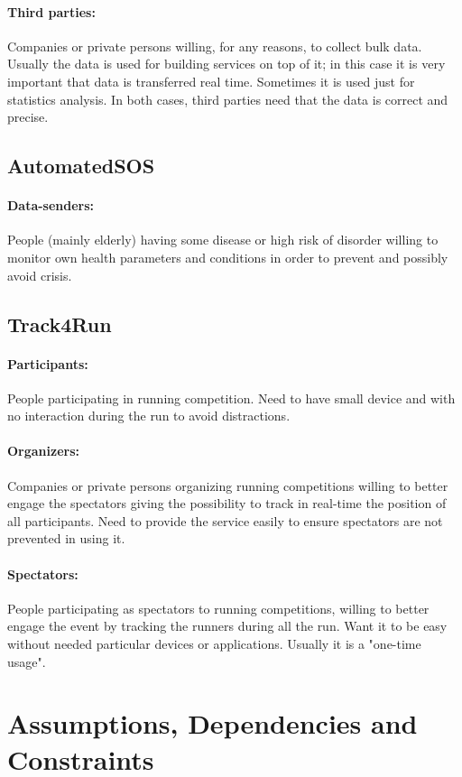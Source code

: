 \documentclass{report}
\begin{document}
				\paragraph{Third parties:}
				Companies or private persons willing, for any reasons, to collect bulk data. Usually the data is used for building services on top of it; in this case it is very important that data is transferred real time. Sometimes it is used just for statistics analysis. In both cases, third parties need that the data is correct and precise. 
			\subsection{AutomatedSOS}
				\paragraph{Data-senders:}
				People (mainly elderly) having some disease or high risk of disorder willing to monitor own health parameters and conditions in order to prevent and possibly avoid crisis.
			\subsection{Track4Run}
				\paragraph{Participants:}
				People participating in running competition. Need to have small device and with no interaction during the run to avoid distractions.
				\paragraph{Organizers:}
				Companies or private persons organizing running competitions willing to better engage the spectators giving the possibility to track in real-time the position of all participants. Need to provide the service easily to ensure spectators are not prevented in using it.
				\paragraph{Spectators:}
				People participating as spectators to running competitions, willing to better engage the event by tracking the runners during all the run. Want it to be easy without needed particular devices or applications. Usually it is a "one-time usage".
		\section{Assumptions, Dependencies and \\ Constraints}
\end{document}
